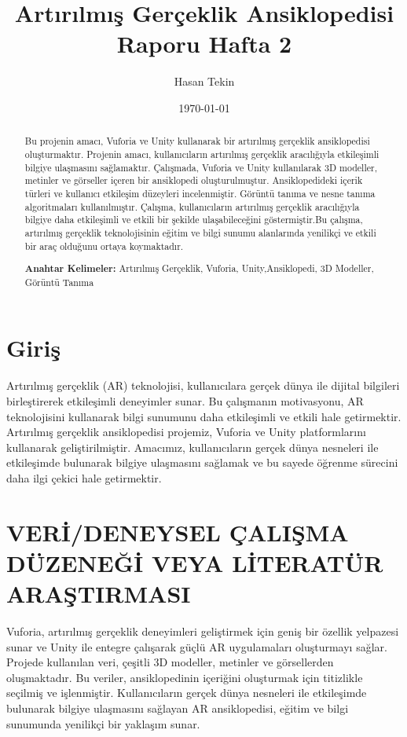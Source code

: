 \documentclass[12pt, a4paper]{article}
\title{Artırılmış Gerçeklik Ansiklopedisi Raporu Hafta 2 }
\author{Hasan Tekin}
\date{\today}
\begin{document}
	\maketitle
	
	\begin{abstract}
		\begin{justify}
		Bu projenin amacı, Vuforia ve Unity kullanarak bir artırılmış \newline gerçeklik ansiklopedisi oluşturmaktır.   Projenin amacı, kullanıcıların artırılmış gerçeklik aracılığıyla etkileşimli bilgiye ulaşmasını sağlamaktır. Çalışmada, Vuforia ve Unity kullanılarak 3D modeller, metinler ve görseller içeren bir ansiklopedi oluşturulmuştur. Ansiklopedideki içerik türleri ve kullanıcı etkileşim düzeyleri incelenmiştir. Görüntü tanıma ve nesne tanıma algoritmaları kullanılmıştır. Çalışma, kullanıcıların artırılmış gerçeklik aracılığıyla bilgiye daha etkileşimli ve etkili bir şekilde ulaşabileceğini göstermiştir.Bu çalışma, artırılmış gerçeklik \newline teknolojisinin eğitim ve bilgi sunumu alanlarında yenilikçi ve etkili bir araç olduğunu ortaya koymaktadır.
	\end{justify}
		\textbf{Anahtar Kelimeler:} Artırılmış Gerçeklik, Vuforia, Unity,Ansiklopedi, 3D Modeller, Görüntü Tanıma

	\end{abstract}
	
	\section{Giriş}
	Artırılmış gerçeklik (AR) teknolojisi, kullanıcılara gerçek dünya ile dijital bilgileri birleştirerek etkileşimli deneyimler sunar. Bu çalışmanın motivasyonu, AR teknolojisini kullanarak bilgi sunumunu daha etkileşimli ve etkili hale getirmektir. Artırılmış gerçeklik ansiklopedisi projemiz, Vuforia ve Unity platformlarını kullanarak geliştirilmiştir. Amacımız, kullanıcıların gerçek dünya nesneleri ile etkileşimde bulunarak bilgiye ulaşmasını sağlamak ve bu sayede öğrenme sürecini daha ilgi çekici hale getirmektir.
	\section{VERİ/DENEYSEL ÇALIŞMA DÜZENEĞİ VEYA LİTERATÜR ARAŞTIRMASI}
	Vuforia, artırılmış gerçeklik deneyimleri geliştirmek için geniş bir özellik yelpazesi sunar ve Unity ile entegre çalışarak güçlü AR uygulamaları oluşturmayı sağlar. Projede kullanılan veri, çeşitli 3D modeller, metinler ve görsellerden oluşmaktadır. Bu veriler, ansiklopedinin içeriğini oluşturmak için titizlikle seçilmiş ve işlenmiştir. Kullanıcıların gerçek dünya nesneleri ile etkileşimde bulunarak bilgiye ulaşmasını sağlayan AR ansiklopedisi, eğitim ve bilgi \newline sunumunda yenilikçi bir yaklaşım sunar.
\end{document}
